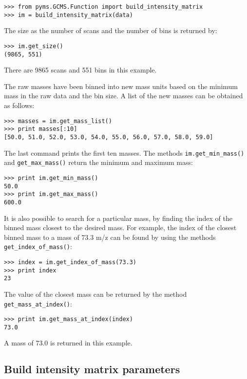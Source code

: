 \begin{verbatim}
>>> from pyms.GCMS.Function import build_intensity_matrix
>>> im = build_intensity_matrix(data)
\end{verbatim}

The size as the number of scans and the number of bins is returned by:
\begin{verbatim}
>>> im.get_size()
(9865, 551)
\end{verbatim}

There are 9865 scans and 551 bins in this example.

The raw masses have been binned into new mass units based on the minimum mass
in the raw data and the bin size. A list of the new masses can be obtained
as follows:

\begin{verbatim}
>>> masses = im.get_mass_list()
>>> print masses[:10]
[50.0, 51.0, 52.0, 53.0, 54.0, 55.0, 56.0, 57.0, 58.0, 59.0]
\end{verbatim}

The last command prints the first ten masses. The methods {\tt im.get\_min\_mass()}
and {\tt get\_max\_mass()} return the minimum and maximum mass:

\begin{verbatim}
>>> print im.get_min_mass()
50.0
>>> print im.get_max_mass()
600.0
\end{verbatim}

It is also possible to search for a particular mass, by finding the index of
the binned mass closest to the desired mass. For example, the index of the
closest binned mass to a mass of 73.3 m/z can be found by using the
methods {\tt get\_index\_of\_mass()}:

\begin{verbatim}
>>> index = im.get_index_of_mass(73.3)
>>> print index
23
\end{verbatim}

The value of the closest mass can be returned by the method
{\tt get\_mass\_at\_index()}:

\begin{verbatim}
>>> print im.get_mass_at_index(index)
73.0
\end{verbatim}

A mass of 73.0 is returned in this example.

\subsection{Build intensity matrix parameters}

